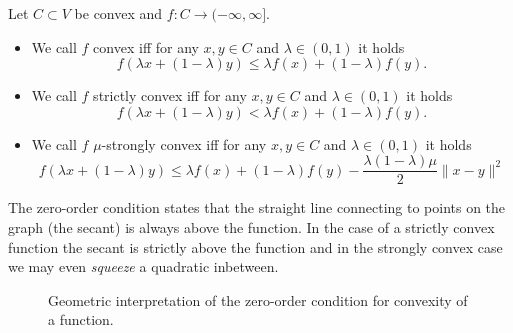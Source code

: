\begin{defn}
    Let $C\subset V$ be convex and $f:C\rightarrow (-\infty,\infty]$.
    \begin{itemize}
        \item We call $f$ convex iff for any $x,y\in C$ and $\lambda\in (0,1)$ it holds
        \begin{equation}
            f(\lambda x + (1-\lambda)y)\leq \lambda f( x ) + (1-\lambda)f(y).
        \end{equation}
        \item We call $f$ strictly convex iff for any $x,y\in C$ and $\lambda\in (0,1)$ it holds
        \begin{equation}
            f(\lambda x + (1-\lambda)y) < \lambda f( x ) + (1-\lambda)f(y).
        \end{equation}
        \item We call $f$ $\mu$-strongly convex iff for any $x,y\in C$ and $\lambda\in (0,1)$ it holds
        \begin{equation}
            f(\lambda x + (1-\lambda)y) \leq \lambda f( x ) + (1-\lambda)f(y) - \frac{\lambda(1-\lambda)\mu}{2}\|x-y\|^2
        \end{equation}
    \end{itemize}
\end{defn}
The zero-order condition states that the straight line connecting to points on the graph (the secant) is always above the function. In the case of a strictly convex function the secant is strictly above the function and in the strongly convex case we may even \emph{squeeze} a quadratic inbetween.


\begin{figure}
    \centering
        \caption{Geometric interpretation of the zero-order condition for convexity of a function.}
\end{figure}


